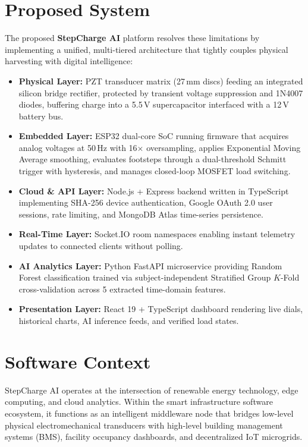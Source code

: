 \section{Proposed System}
The proposed \textbf{StepCharge AI} platform resolves these limitations by implementing a unified, multi-tiered architecture that tightly couples physical harvesting with digital intelligence:
\begin{itemize}
    \item \textbf{Physical Layer:} PZT transducer matrix (27\,mm discs) feeding an integrated silicon bridge rectifier, protected by transient voltage suppression and 1N4007 diodes, buffering charge into a 5.5\,V supercapacitor interfaced with a 12\,V battery bus.
    \item \textbf{Embedded Layer:} ESP32 dual-core SoC running firmware that acquires analog voltages at 50\,Hz with 16$\times$ oversampling, applies Exponential Moving Average smoothing, evaluates footsteps through a dual-threshold Schmitt trigger with hysteresis, and manages closed-loop MOSFET load switching.
    \item \textbf{Cloud \& API Layer:} Node.js + Express backend written in TypeScript implementing SHA-256 device authentication, Google OAuth 2.0 user sessions, rate limiting, and MongoDB Atlas time-series persistence.
    \item \textbf{Real-Time Layer:} Socket.IO room namespaces enabling instant telemetry updates to connected clients without polling.
    \item \textbf{AI Analytics Layer:} Python FastAPI microservice providing Random Forest classification trained via subject-independent Stratified Group $K$-Fold cross-validation across 5 extracted time-domain features.
    \item \textbf{Presentation Layer:} React 19 + TypeScript dashboard rendering live dials, historical charts, AI inference feeds, and verified load states.
\end{itemize}

\section{Software Context}
StepCharge AI operates at the intersection of renewable energy technology, edge computing, and cloud analytics. Within the smart infrastructure software ecosystem, it functions as an intelligent middleware node that bridges low-level physical electromechanical transducers with high-level building management systems (BMS), facility occupancy dashboards, and decentralized IoT microgrids.

